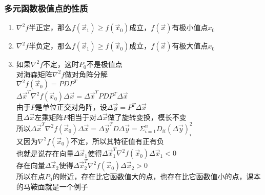 \documentclass[xetex]{beamer}
\begin{document}
\begin{frame}

	\frametitle{多元函数极值点的性质}
	\begin{enumerate}
		\item	$\nabla^2 f$半正定，那么$f(\vec x_1)\geq f(\vec x_0)$成立，$f(\vec x)$有极小值点$x_0$\\
		\item	$\nabla^2 f$半负定，那么$f(\vec x_1)\geq f(\vec x_0)$成立，$f(\vec x)$有极大值点$x_0$\\ \pause
		\item 	如果$\nabla^2 f$不定，这时$P_0$不是极值点\\
		对海森矩阵$\nabla^2 f$做对角阵分解\\ \pause
		$\nabla^2 f(\vec x_0)=PDP^T$\\
		$\Delta \vec x^T\nabla^2 f(\vec x_0)\Delta \vec x=\Delta \vec x^T PDP^T\Delta \vec x$\\ \pause
		由于$P$是单位正交对角阵，设$\Delta \vec y=P^T\Delta  \vec x$\\
		且$\Delta  \vec x$左乘矩阵$P$相当于对$\Delta  \vec x$做了旋转变换，模长不变\\ \pause
		所以$\Delta \vec x^T\nabla^2 f(\vec x_0)\Delta \vec x=\Delta \vec y^T D\Delta \vec y=\Sigma_{i=1}^nD_{ii}(\Delta \vec y)^2_i$\\
		又因为$\nabla^2 f(\vec x_0)$不定，所以其特征值有正有负\\ \pause
		也就是说存在向量$\Delta \vec x_1$\quad 使得$\Delta \vec x_1^T\nabla^2 f(\vec x_0)\Delta \vec x_1<0$\\ 
		存在向量$\Delta \vec x_2$\quad 使得$\Delta \vec x_2^T\nabla^2 f(\vec x_0)\Delta \vec x_2>0$\\ \pause
		所以在点$P_0$的附近，存在比它函数值大的点，也存在比它函数值小的点，课本的马鞍面就是一个例子\\
		
	\end{enumerate}
	
\end{frame}
\end{document}
